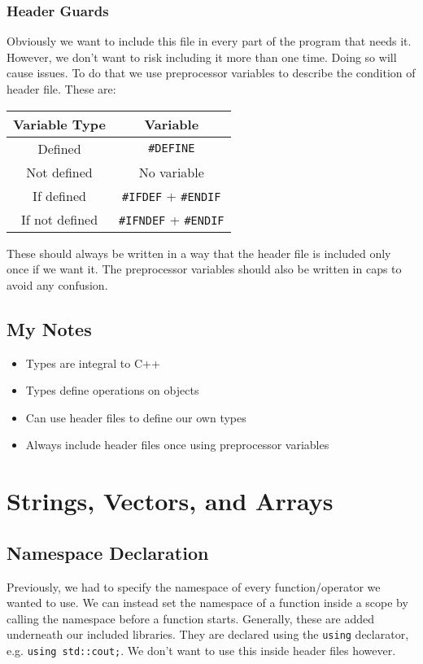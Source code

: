 \documentclass[12pt, a4paper]{report}
\begin{document}
\subsection{Header Guards}
Obviously we want to include this file in every part of the program that needs it. However, we don't want to risk including it more than one time. Doing so will cause issues. To do that we use preprocessor variables to describe the condition of header file. These are: 
\begin{center}
  \begin{tabular}{ |c|c| }
    \hline
    \textbf{Variable Type} & \textbf{Variable} \\
    \hline
    Defined & \verb|#DEFINE| \\
    \hline
    Not defined & No variable \\
    \hline
    If defined & \verb|#IFDEF| + \verb|#ENDIF| \\
    \hline
    If not defined & \verb|#IFNDEF| + \verb|#ENDIF| \\
    \hline
  \end{tabular}
\end{center}
These should always be written in a way that the header file is included only once if we want it. The preprocessor variables should also be written in caps to avoid any confusion.
\section{My Notes}
\begin{itemize}
  \item Types are integral to C++
  \item Types define operations on objects
  \item Can use header files to define our own types
  \item Always include header files once using preprocessor variables
\end{itemize}

\chapter{Strings, Vectors, and Arrays}
\section{Namespace Declaration}
Previously, we had to specify the namespace of every function/operator we wanted to use. We can instead set the namespace of a function inside a scope by calling the namespace before a function starts. Generally, these are added underneath our included libraries. They are declared using the \verb|using| declarator,
e.g. \verb|using std::cout;|. We don't want to use this inside header files however.
\end{document}
